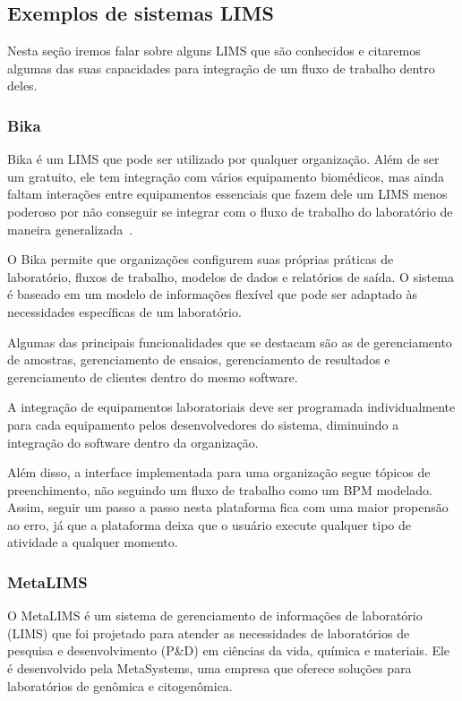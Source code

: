 \subsection{Exemplos de sistemas LIMS} \label{sec:lims-exemplo}

Nesta seção iremos falar sobre alguns LIMS que são conhecidos e citaremos algumas das suas capacidades para integração de um fluxo de trabalho dentro deles.

\subsubsection{Bika}

Bika é um LIMS que pode ser utilizado por qualquer organização. Além de ser um gratuito, ele tem integração com vários equipamento biomédicos, mas ainda faltam interações entre equipamentos essenciais que fazem dele um LIMS menos poderoso por não conseguir se integrar com o fluxo de trabalho do laboratório de maneira generalizada~\cite{Ademuyiwa2018DevelopmentBiobanking}.

O Bika permite que organizações configurem suas próprias práticas de laboratório, fluxos de trabalho, modelos de dados e relatórios de saída. O sistema é baseado em um modelo de informações flexível que pode ser adaptado às necessidades específicas de um laboratório.

Algumas das principais funcionalidades que se destacam são as de gerenciamento de amostras, gerenciamento de ensaios, gerenciamento de resultados e gerenciamento de clientes dentro do mesmo software.

A integração de equipamentos laboratoriais deve ser programada individualmente para cada equipamento pelos desenvolvedores do sistema, diminuindo a integração do software dentro da organização.

Além disso, a interface implementada para uma organização segue tópicos de preenchimento, não seguindo um fluxo de trabalho como um BPM modelado. Assim, seguir um passo a passo nesta plataforma fica com uma maior propensão ao erro, já que a plataforma deixa que o usuário execute qualquer tipo de atividade a qualquer momento.

\subsubsection{MetaLIMS}

O MetaLIMS é um sistema de gerenciamento de informações de laboratório (LIMS) que foi projetado para atender as necessidades de laboratórios de pesquisa e desenvolvimento (P\&D) em ciências da vida, química e materiais. Ele é desenvolvido pela MetaSystems, uma empresa que oferece soluções para laboratórios de genômica e citogenômica.

